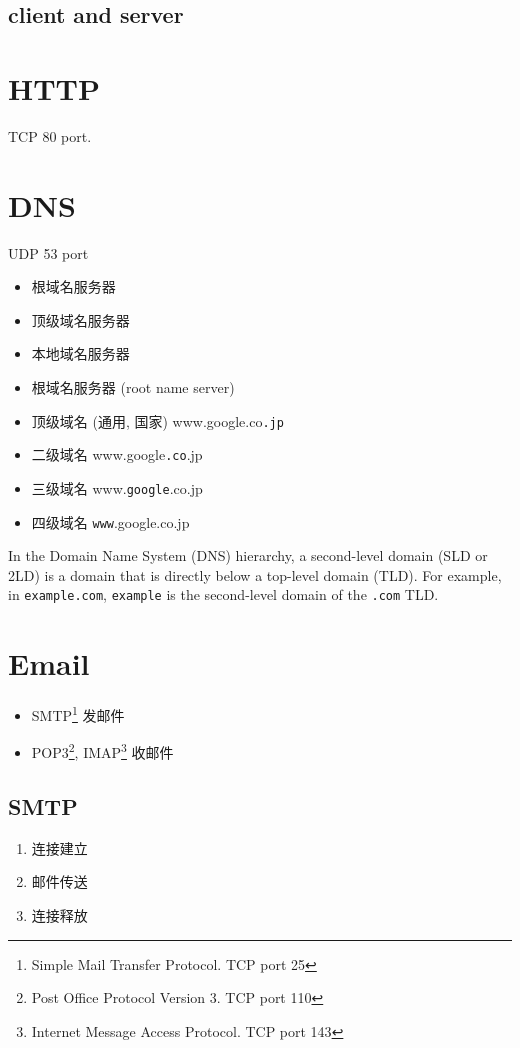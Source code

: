 \documentclass[a4paper]{report}
\begin{document}
\subsection{client and server}
\section{HTTP}
TCP 80 port. 

\section{DNS}
UDP 53 port
\begin{itemize}
  \item 根域名服务器
  \item 顶级域名服务器
  \item 本地域名服务器
\end{itemize}

\begin{itemize}
  \item 根域名服务器 (root name server)
  \item 顶级域名 (通用, 国家) www.google.co\texttt{.jp}
  \item 二级域名 www.google\texttt{.co}.jp
  \item 三级域名 www.\texttt{google}.co.jp
  \item 四级域名 \texttt{www}.google.co.jp
\end{itemize}

In the Domain Name System (DNS) hierarchy, a second-level domain (SLD or 2LD) is a domain that is directly below a top-level domain (TLD). For example, in \texttt{example.com}, \texttt{example} is the second-level domain of the \texttt{.com} TLD.
\section{Email}
\begin{itemize}
  \item SMTP\footnote{Simple Mail Transfer Protocol. TCP port 25 } 发邮件
  \item POP3\footnote{Post Office Protocol Version 3. TCP port 110}, IMAP\footnote{Internet Message Access Protocol. TCP port 143 } 收邮件
\end{itemize}
\subsection{SMTP}
\begin{enumerate}
  \item 连接建立
  \item 邮件传送
  \item 连接释放
\end{enumerate}
\end{document}
